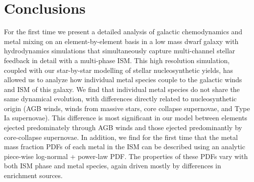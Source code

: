 \documentclass[twocolumn]{aastex61}
\begin{document}
\section{Conclusions}
\label{sec:conclusions}
For the first time we present a detailed analysis of galactic chemodynamics and metal mixing on an element-by-element basis in a low mass dwarf galaxy with hydrodynamics simulations that simultaneously capture multi-channel stellar feedback in detail with a multi-phase ISM. This high resolution simulation, coupled with our star-by-star modelling of stellar nucleosynthetic yields, has allowed us to analyze how individual metal species couple to the galactic winds and ISM of this galaxy. We find that individual metal species do not share the same dynamical evolution, with differences directly related to nucleosynthetic origin (AGB winds, winds from massive stars, core collapse supernovae, and Type Ia supernovae). This difference is most significant in our model between elements ejected predominately through AGB winds and those ejected predominantly by core-collapse supernovae. In addition, we find for the first time that the metal mass fraction PDFs of each metal in the ISM can be described using an analytic piece-wise log-normal + power-law PDF. The properties of these PDFs vary with both ISM phase and metal species, again driven mostly by differences in enrichment sources.
\end{document}
